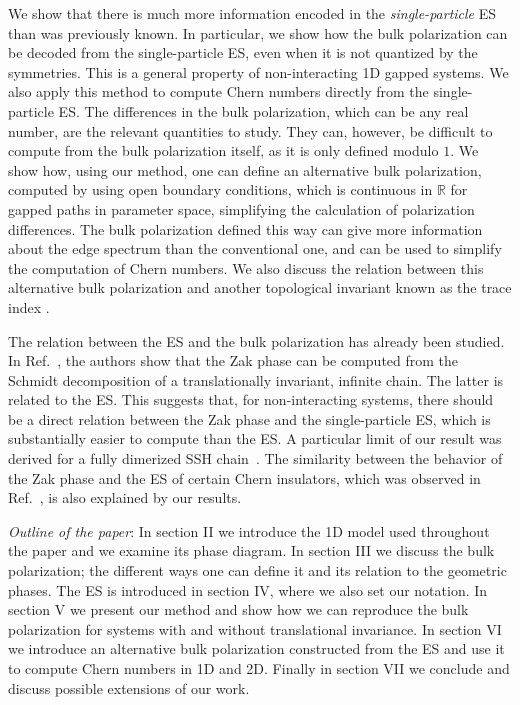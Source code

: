 \documentclass[twocolumn,amsmath,longbibliography,amssymb,superscriptaddress]{revtex4-1}
\begin{document}
We show that there is much more information encoded in the \emph{single-particle} ES than was previously known. In particular, we show how the bulk polarization can be decoded from the single-particle ES, even when it is not quantized by the symmetries. This is a general property of non-interacting 1D gapped systems. We also apply this method to compute Chern numbers directly from the single-particle ES. The differences in the bulk polarization, which can be any real number, are the relevant quantities to study. They can, however, be difficult to compute from the bulk polarization itself, as it is only defined modulo $1$. We show how, using our method, one can define an alternative bulk polarization, computed by using open boundary conditions, which is continuous in $\mathbb{R}$ for gapped paths in parameter space, simplifying the calculation of polarization differences. The bulk polarization defined this way can give more information about the edge spectrum than the conventional one, and can be used to simplify the computation of Chern numbers. We also discuss the relation between this alternative bulk polarization and another topological invariant known as the trace index \cite{Alexandrinata2011}. 

The relation between the ES and the bulk polarization has already been studied. 
In Ref.~\cite{Zaletel2014}, the authors show that the Zak phase can be computed from the Schmidt decomposition of a translationally invariant, infinite chain. The latter is related to the ES.
This suggests that, for non-interacting systems, there should be a direct relation between the Zak phase and the single-particle ES, which is substantially easier to compute than the ES. A particular limit of our result was derived for a fully dimerized SSH chain~\cite{Ryu2006}. 
The similarity between the behavior of the Zak phase and the ES of certain Chern insulators, which was observed in Ref.~\cite{Huang2012,Huang2012-2}, is also explained by our results. 


\emph{Outline of the paper}: In section II we introduce the 1D model used throughout the paper and we examine its phase diagram. In section III we discuss the bulk polarization; the different ways one can define it and its relation to the geometric phases. The ES is introduced in section IV, where we also set our notation. In section V we present our method and show how we can reproduce the bulk polarization for systems with and without translational invariance. In section VI we introduce an alternative bulk polarization constructed from the ES and use it to compute Chern numbers in 1D and 2D. Finally in section VII we conclude and discuss possible extensions of our work.
\end{document}
